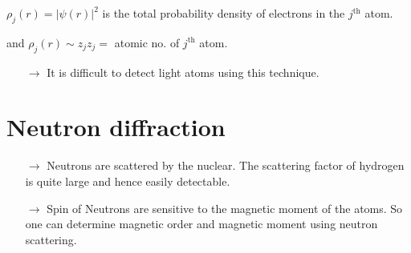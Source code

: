 $\rho_{j}(r)=|\psi(r)|^{2}$ is the total probability density of electrons in the $j^{\text{th}}$ atom.

and $\rho_{j}(r)\sim z_{j}$\quad $z_{j}=$ atomic no. of $j^{\text{th}}$ atom.
\begin{itemize}
\item[$\to$] It is difficult to detect light atoms using this technique.
\end{itemize}

\section*{Neutron diffraction}
\begin{itemize}
\item[$\to$] Neutrons are scattered by the nuclear. The scattering factor of hydrogen is quite large and hence easily detectable.

\item[$\to$] Spin of Neutrons are sensitive to the magnetic moment of the atoms. So one can determine magnetic order and magnetic moment using neutron scattering.
\end{itemize}


